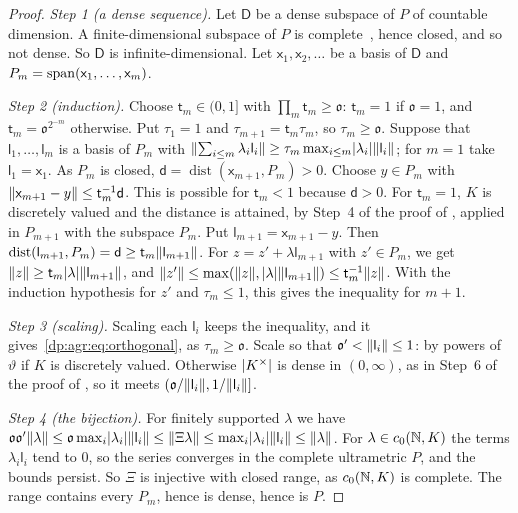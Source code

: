 \begin{proof}
\emph{Step 1 (a dense sequence).} Let $\mathsf D$ be a dense subspace of $P$ of countable dimension. A finite-dimensional subspace of $P$ is complete~\cite[Lemma~A.3]{I}, hence closed, and so not dense. So $\mathsf D$ is infinite-dimensional. Let $\mathsf x_1,\mathsf x_2,\dots$ be a basis of $\mathsf D$ and $P_m=\operatorname{span}(\mathsf x_1,\dots,\mathsf x_m)$.

\emph{Step 2 (induction).} Choose $\mathsf t_m\in(0,1]$ with $\prod_m\mathsf t_m\ge\mathfrak o$: $\mathsf t_m=1$ if $\mathfrak o=1$, and $\mathsf t_m=\mathfrak o^{2^{-m}}$ otherwise. Put $\tau_1=1$ and $\tau_{m+1}=\mathsf t_m\tau_m$, so $\tau_m\ge\mathfrak o$. Suppose that $\mathsf l_1,\dots,\mathsf l_m$ is a basis of $P_m$ with $\lVert \sum_{i\le m}\lambda_i\mathsf l_i\rVert\ge\tau_m\max_{i\le m}\lvert \lambda_i\rvert\lVert \mathsf l_i\rVert$; for $m=1$ take $\mathsf l_1=\mathsf x_1$. As $P_m$ is closed, $\mathsf d=\operatorname{dist}(\mathsf x_{m+1},P_m)>0$. Choose $y\in P_m$ with $\lVert \mathsf x_{m+1}-y\rVert\le\mathsf t_m^{-1}\mathsf d$. This is possible for $\mathsf t_m<1$ because $\mathsf d>0$. For $\mathsf t_m=1$, $K$ is discretely valued and the distance is attained, by Step~4 of the proof of \cite[Lemma~Q.13]{I}, applied in $P_{m+1}$ with the subspace $P_m$. Put $\mathsf l_{m+1}=\mathsf x_{m+1}-y$. Then $\operatorname{dist}(\mathsf l_{m+1},P_m)=\mathsf d\ge\mathsf t_m\lVert \mathsf l_{m+1}\rVert$. For $z=z'+\lambda\mathsf l_{m+1}$ with $z'\in P_m$, we get $\lVert z\rVert\ge\mathsf t_m\lvert \lambda\rvert\lVert \mathsf l_{m+1}\rVert$, and $\lVert z'\rVert\le\max(\lVert z\rVert,\lvert \lambda\rvert\lVert \mathsf l_{m+1}\rVert)\le\mathsf t_m^{-1}\lVert z\rVert$. With the induction hypothesis for $z'$ and $\tau_m\le1$, this gives the inequality for $m+1$.

\emph{Step 3 (scaling).} Scaling each $\mathsf l_i$ keeps the inequality, and it gives~\eqref{dp:agr:eq:orthogonal}, as $\tau_m\ge\mathfrak o$. Scale so that $\mathfrak o'<\lVert \mathsf l_i\rVert\le1$: by powers of $\vartheta$ if $K$ is discretely valued. Otherwise $\lvert K^\times\rvert$ is dense in $(0,\infty)$, as in Step~6 of the proof of \cite[Lemma~Q.13]{I}, so it meets $(\mathfrak o/\lVert \mathsf l_i\rVert,1/\lVert \mathsf l_i\rVert]$.

\emph{Step 4 (the bijection).} For finitely supported $\lambda$ we have $\mathfrak o\mathfrak o'\lVert \lambda\rVert\le\mathfrak o\max_i\lvert \lambda_i\rvert\lVert \mathsf l_i\rVert\le\lVert \Xi\lambda\rVert\le\max_i\lvert \lambda_i\rvert\lVert \mathsf l_i\rVert\le\lVert \lambda\rVert$. For $\lambda\in c_0(\mathbb N,K)$ the terms $\lambda_i\mathsf l_i$ tend to $0$, so the series converges in the complete ultrametric $P$, and the bounds persist. So $\Xi$ is injective with closed range, as $c_0(\mathbb N,K)$ is complete. The range contains every $P_m$, hence is dense, hence is $P$.
\end{proof}

